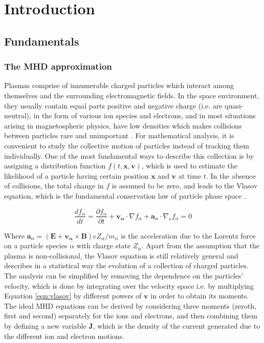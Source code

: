 \chapter{Introduction}

\section{Fundamentals}


\subsection{The MHD approximation}

Plasmas comprise of innumerable charged particles which interact among themselves and the surrounding electromagnetic fields. In the space environment, they usually contain equal parts positive and negative charge (i.e. are quasi-neutral), in the form of various ion species and electrons, and in most situations arising in magnetospheric physics, have low densities which makes collisions between particles rare and unimportant \cite{Bruno2013TheLaboratory}. For mathematical analysis, it is convenient to study the collective motion of particles instead of tracking them individually. One of the most fundamental ways to describe this collection is by assigning a distribution function $f(t, \mathbf{x}, \mathbf{v})$, which is used to estimate the likelihood of a particle having certain position $\mathbf{x}$ and $\mathbf{v}$ at time $t$. In the absence of collisions, the total change in $f$ is assumed to be zero, and leads to the Vlasov equation, which is the fundamental conservation law of particle phase space \cite{Chen1995IntroductionPhysics,Gombosi1998PhysicsEnvironment}. 

\begin{equation}
    \frac{df_\alpha}{dt} = \frac{\partial f_\alpha}{\partial t} + \mathbf{v_\alpha}\cdot\nabla f_\alpha + \mathbf{a}_\alpha \cdot \nabla_v f_\alpha = 0
    \label{eqn:vlasov}
\end{equation}

Where $\mathbf{a}_\alpha = (\mathbf{E} + \mathbf{v_\alpha} \times \mathbf{B})e Z_\alpha/m_\alpha$ is the acceleration due to the Lorentz force on a particle species $\alpha$ with charge state $Z_\alpha$. Apart from the assumption that the plasma is non-collisional, the Vlasov equation is still relatively general and describes in a statistical way the evolution of a collection of charged particles. The analysis can be simplified by removing the dependence on the particles' velocity, which is done by integrating over the velocity space i.e. by multiplying Equation \ref{eqn:vlasov} by different powers of $\mathbf{v}$ in order to obtain its moments. The ideal MHD equations can be derived by considering three moments (zeroth, first and second) separately for the ions and electrons, and then combining them by defining a new variable $\mathbf{J}$, which is the density of the current generated due to the different ion and electron motions. 


